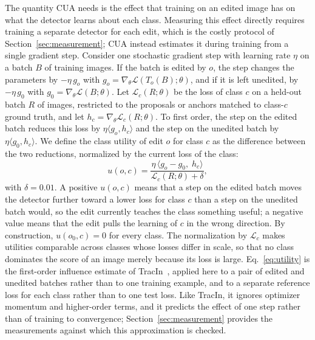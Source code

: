 \documentclass[conference]{IEEEtran}
\begin{document}
The quantity CUA needs is the effect that training on an edited image has on what the detector learns about each class. Measuring this effect directly requires training a separate detector for each edit, which is the costly protocol of Section~\ref{sec:measurement}; CUA instead estimates it during training from a single gradient step. Consider one stochastic gradient step with learning rate $\eta$ on a batch $B$ of training images. If the batch is edited by $o$, the step changes the parameters by $-\eta\,g_o$ with $g_o=\nabla_\theta\mathcal{L}(T_o(B);\theta)$, and if it is left unedited, by $-\eta\,g_0$ with $g_0=\nabla_\theta\mathcal{L}(B;\theta)$. Let $\mathcal{L}_c(R;\theta)$ be the loss of class $c$ on a held-out batch $R$ of images, restricted to the proposals or anchors matched to class-$c$ ground truth, and let $h_c=\nabla_\theta\mathcal{L}_c(R;\theta)$. To first order, the step on the edited batch reduces this loss by $\eta\langle g_o,h_c\rangle$ and the step on the unedited batch by $\eta\langle g_0,h_c\rangle$. We define the class utility of edit $o$ for class $c$ as the difference between the two reductions, normalized by the current loss of the class:
\begin{equation}
u(o,c)=\frac{\eta\,\langle g_o-g_0,\;h_c\rangle}{\mathcal{L}_c(R;\theta)+\delta},
\label{eq:utility}
\end{equation}
with $\delta=0.01$. A positive $u(o,c)$ means that a step on the edited batch moves the detector further toward a lower loss for class $c$ than a step on the unedited batch would, so the edit currently teaches the class something useful; a negative value means that the edit pulls the learning of $c$ in the wrong direction. By construction, $u(o_0,c)=0$ for every class. The normalization by $\mathcal{L}_c$ makes utilities comparable across classes whose losses differ in scale, so that no class dominates the score of an image merely because its loss is large. Eq.~\eqref{eq:utility} is the first-order influence estimate of TracIn~\cite{pruthi2020tracin}, applied here to a pair of edited and unedited batches rather than to one training example, and to a separate reference loss for each class rather than to one test loss. Like TracIn, it ignores optimizer momentum and higher-order terms, and it predicts the effect of one step rather than of training to convergence; Section~\ref{sec:measurement} provides the measurements against which this approximation is checked.
\end{document}
